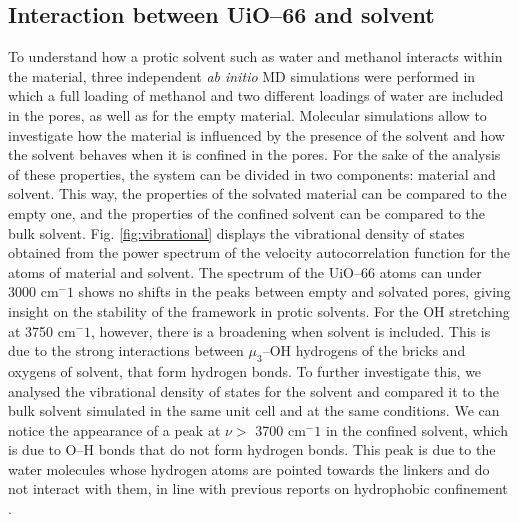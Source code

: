 \subsection*{Interaction between UiO--66 and solvent}
To understand how a protic solvent such as water and methanol interacts within the material, three independent \textit{ab initio} MD simulations were performed in which a full loading of methanol and two different loadings of water are included in the pores, as well as for the empty material. Molecular simulations allow to investigate how the material is influenced by the presence of the solvent and how the solvent behaves when it is confined in the pores. For the sake of the analysis of these properties, the system can be divided in two components: material and solvent. This way, the properties of the solvated material can be compared to the empty one, and the properties of the confined solvent can be compared to the bulk solvent. Fig. \ref{fig:vibrational} displays the vibrational density of states obtained from the power spectrum of the velocity autocorrelation function for the atoms of material and solvent. 
\npar
The spectrum of the UiO--66 atoms can under 3000 cm$^-1$ shows no shifts in the peaks between empty and solvated pores, giving insight on the stability of the framework in protic solvents. For the OH stretching at 3750 cm$^-1$, however, there is a broadening when solvent is included. This is due to the strong interactions between $\mu_3$--OH hydrogens of the bricks and oxygens of solvent, that form hydrogen bonds. To further investigate this, we analysed the vibrational density of states for the solvent and compared it to the bulk solvent simulated in the same unit cell and at the same conditions. We can notice the appearance of a peak at $\nu >$ 3700 cm$^-1$ in the confined solvent, which is due to O--H bonds that do not form hydrogen bonds. This peak is due to the water molecules whose hydrogen atoms are pointed towards the linkers and do not interact with them, in line with previous reports on hydrophobic confinement \cite{coudert2006dipole, dalla2016water, cicero2008water}. 

